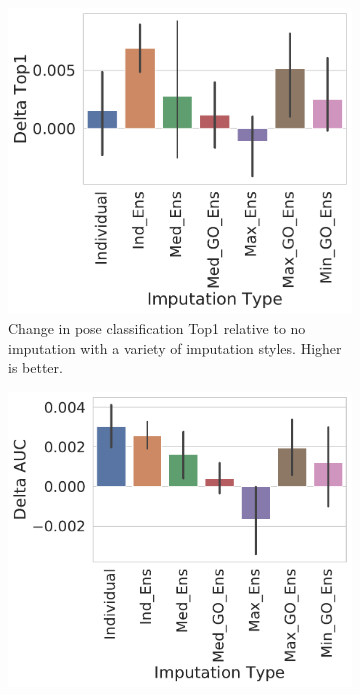 \documentclass[journal=jmcmar,manuscript=article]{achemso}
\begin{document}
\begin{figure}[tbph]
    \begin{subfigure}[t]{0.48\textwidth}
        \centering
        \includegraphics[width=\linewidth]{figures/ComparingImpStylesTop1.pdf}
        \caption{Change in pose classification Top1 relative to no imputation with a variety of imputation styles. Higher is better.}
    \end{subfigure}
    \hfill
    \begin{subfigure}[t]{0.48\textwidth}
        \centering
        \includegraphics[width=\linewidth]{figures/ComparingImpStylesAUC.pdf}

\end{subfigure}
\end{figure}
\end{document}
